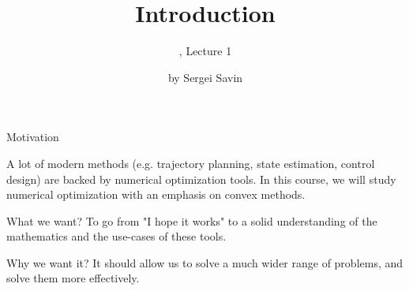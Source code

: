 \documentclass{beamer}
\title{Introduction}
\subtitle{\mycoursetitle, Lecture 1}
\author{by Sergei Savin}
\date{\mydate}
\begin{document}
\maketitle


%
%



\begin{frame}{Motivation}
\begin{flushleft}


A lot of modern methods (e.g. trajectory planning, state estimation, control design) are backed by numerical optimization tools. In this course, we will study numerical optimization with an emphasis on convex methods.

\begin{block}{What we want?}
  To go from "I hope it works" to a solid understanding of the mathematics and the use-cases of these tools.
\end{block}

\begin{block}{Why we want it?}
  It should allow us to solve a much wider range of problems, and solve them more effectively.
\end{block}

\end{flushleft}
\end{frame}
\end{document}
